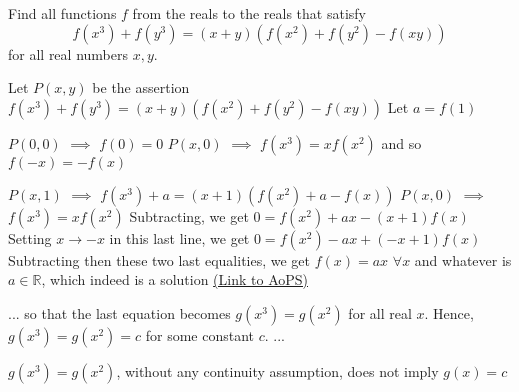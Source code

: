\begin{problem}
	\begin{tcolorbox}Find all functions $f$ from the reals to the reals that satisfy \[f(x^3)+f(y^3)=(x+y)(f(x^2)+f(y^2)-f(xy))\] for all real numbers $x,y$.\end{tcolorbox}
Let $P(x,y)$ be the assertion $f(x^3)+f(y^3)=(x+y)(f(x^2)+f(y^2)-f(xy))$
Let $a=f(1)$

$P(0,0)$ $\implies$ $f(0)=0$
$P(x,0)$ $\implies$ $f(x^3)=xf(x^2)$ and so $f(-x)=-f(x)$

$P(x,1)$ $\implies$ $f(x^3)+a=(x+1)(f(x^2)+a-f(x))$
$P(x,0)$ $\implies$ $f(x^3)=xf(x^2)$
Subtracting, we get $0=f(x^2)+ax-(x+1)f(x)$
Setting $x\to -x$ in this last line, we get $0=f(x^2)-ax+(-x+1)f(x)$
Subtracting then these two last equalities, we get $\boxed{f(x)=ax}$ $\forall x$ and whatever is $a\in\mathbb R$, which indeed is a solution
	\flushright \href{https://artofproblemsolving.com/community/c6h559755}{(Link to AoPS)}
\end{problem}



\begin{solution}
	\begin{tcolorbox}... 
so that the last equation becomes $g(x^3)=g(x^2)$ for all real $x$. Hence, $g(x^3)=g(x^2)=c$ for some constant $c$. 
...
\end{tcolorbox}
$g(x^3)=g(x^2)$, without any continuity assumption, does not imply $g(x)=c$
\end{solution}






